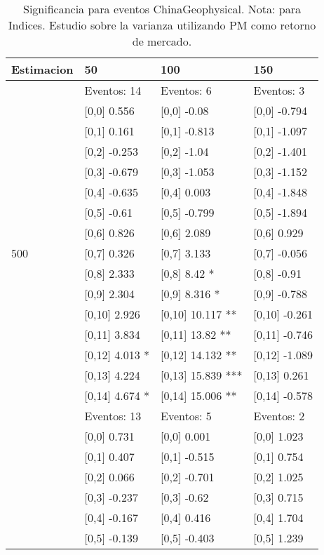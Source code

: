 \begin{table}

\caption{Significancia para eventos ChinaGeophysical. Nota: para Indices. Estudio sobre la varianza utilizando PM como retorno de mercado.}
\centering
\begin{tabular}[t]{llll}
\toprule
Estimacion & 50 & 100 & 150\\
\midrule
 & Eventos:  14 & Eventos:  6 & Eventos:  3\\
 & {}[0,0] 0.556 & {}[0,0] -0.08 & {}[0,0] -0.794\\
 & {}[0,1] 0.161 & {}[0,1] -0.813 & {}[0,1] -1.097\\
 & {}[0,2] -0.253 & {}[0,2] -1.04 & {}[0,2] -1.401\\
 & {}[0,3] -0.679 & {}[0,3] -1.053 & {}[0,3] -1.152\\
\addlinespace
 & {}[0,4] -0.635 & {}[0,4] 0.003 & {}[0,4] -1.848\\
 & {}[0,5] -0.61 & {}[0,5] -0.799 & {}[0,5] -1.894\\
 & {}[0,6] 0.826 & {}[0,6] 2.089 & {}[0,6] 0.929\\
500 & {}[0,7] 0.326 & {}[0,7] 3.133 & {}[0,7] -0.056\\
 & {}[0,8] 2.333 & {}[0,8] 8.42 * & {}[0,8] -0.91\\
\addlinespace
 & {}[0,9] 2.304 & {}[0,9] 8.316 * & {}[0,9] -0.788\\
 & {}[0,10] 2.926 & {}[0,10] 10.117 ** & {}[0,10] -0.261\\
 & {}[0,11] 3.834 & {}[0,11] 13.82 ** & {}[0,11] -0.746\\
 & {}[0,12] 4.013 * & {}[0,12] 14.132 ** & {}[0,12] -1.089\\
 & {}[0,13] 4.224 & {}[0,13] 15.839 *** & {}[0,13] 0.261\\
\addlinespace
 & {}[0,14] 4.674 * & {}[0,14] 15.006 ** & {}[0,14] -0.578\\
 & Eventos:  13 & Eventos:  5 & Eventos:  2\\
 & {}[0,0] 0.731 & {}[0,0] 0.001 & {}[0,0] 1.023\\
 & {}[0,1] 0.407 & {}[0,1] -0.515 & {}[0,1] 0.754\\
 & {}[0,2] 0.066 & {}[0,2] -0.701 & {}[0,2] 1.025\\
\addlinespace
 & {}[0,3] -0.237 & {}[0,3] -0.62 & {}[0,3] 0.715\\
 & {}[0,4] -0.167 & {}[0,4] 0.416 & {}[0,4] 1.704\\
 & {}[0,5] -0.139 & {}[0,5] -0.403 & {}[0,5] 1.239\\

\end{tabular}
\end{table}
